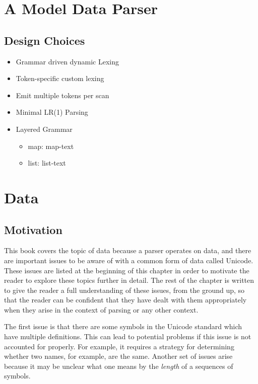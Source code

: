 \documentclass{book}
\begin{document}
\chapter{A Model Data Parser}

\section{Design Choices}
\begin{itemize}
\item
Grammar driven dynamic Lexing
\item
Token-specific custom lexing
\item
Emit multiple tokens per scan
\item
Minimal LR(1) Parsing
\item
Layered Grammar
\begin{itemize}
    \item map: map-text
    \item list: list-text
\end{itemize}
\end{itemize}


\appendix

%
%
\chapter{Data}\label{ch.Data}

\section{Motivation}
This book covers the topic of data because a parser
operates on data, and there are important issues to be
aware of with a common form of data called Unicode.
These issues are listed at the beginning of this chapter
in order to motivate the reader to explore these topics
further in detail.
The rest of the chapter is written to give the reader a
full understanding of these issues, from the ground up,
so that the reader can be confident that they have dealt
with them appropriately when they arise in the context of
parsing or any other context.

The first issue is that there are some symbols in the Unicode standard
which have multiple definitions. This can lead to potential
problems if this issue is not accounted for properly. For example,
it requires a strategy for determining whether two names, for
example, are the same. Another set of issues arise because it may
be unclear what one means by the \textit{length} of a sequences
of symbols.
\end{document}
